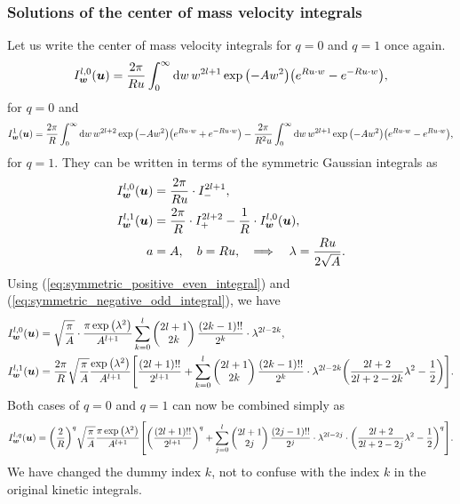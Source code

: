 \documentclass[aps,prl,preprint,groupedaddress,10pt]{revtex4-2}
\begin{document}
\subsubsection{Solutions of the center of mass velocity integrals}
Let us write the center of mass velocity integrals for $q=0$ and $q=1$ once again.
\begin{equation}
    I_{\bw}^{l,0}(\bu)=\frac{2\pi}{Ru}\int_0^{\infty}\dd{w}w^{2l+1}\exp\pqty{-Aw^2}
    \pqty{e^{Ru\cdot w}-e^{-Ru\cdot w}},
\end{equation}
for $q=0$ and
\begin{equation}
    I_{\bw}^{1}(\bu)=\frac{2\pi}{R}\int_0^{\infty}\dd{w}w^{2l+2}\exp\pqty{-Aw^2}
    \pqty{e^{Ru\cdot w}+e^{-Ru\cdot w}}
    -\frac{2\pi}{R^2u}\int_0^{\infty}\dd{w}w^{2l+1}\exp\pqty{-Aw^2}
    \pqty{e^{Ru\cdot w}-e^{Ru\cdot w}},
\end{equation}
for $q=1$. They can be written in terms of the symmetric Gaussian integrals as
\begin{equation}
    \begin{split}
        I_{\vb*{w}}^{l,0}(\vb*{u})&=\frac{2\pi}{Ru}\cdot I^{2l+1}_{-},\\
        I_{\vb*{w}}^{l,1}(\vb*{u})&=\frac{2\pi}{R}\cdot I^{2l+2}_{+}-\frac{1}{R}\cdot I_{\vb*{w}}^{l,0}(\vb*{u}),\\
        a&=A,\quad b=Ru,\quad\Longrightarrow\quad\lambda=\frac{Ru}{2\sqrt{A}}.
    \end{split}
\end{equation}
Using (\ref{eq:symmetric_positive_even_integral}) and (\ref{eq:symmetric_negative_odd_integral}), we have
\begin{equation}
    \begin{split}
        I_{\bw}^{l,0}(\bu)&=\sqrt{\frac{\pi}{A}}\cdot\frac{\pi\exp\pqty{\lambda^2}}{A^{l+1}}
        \sum_{k=0}^{l}\pmqty{2l+1\\2k}\frac{(2k-1)!!}{2^{k}}\cdot\lambda^{2l-2k},\\
        I_{\bw}^{l,1}(\bu)&=\frac{2\pi}{R}\sqrt{\frac{\pi}{A}}\frac{\exp\pqty{\lambda^2}}{A^{l+1}}
        \bqty{\frac{(2l+1)!!}{2^{l+1}}+\sum_{k=0}^{l}\pmqty{2l+1\\2k}\frac{(2k-1)!!}{2^k}
            \cdot\lambda^{2l-2k}\pqty{\frac{2l+2}{2l+2-2k}\lambda^2-\frac{1}{2}}}.
    \end{split}
\end{equation}
Both cases of $q=0$ and $q=1$ can now be combined simply as
\begin{equation}
    I_{\bw}^{l,q}(\bu)=\pqty{\frac{2}{R}}^q\sqrt{\frac{\pi}{A}}\frac{\pi\exp\pqty{\lambda^2}}{A^{l+1}}
    \bqty{\pqty{\frac{(2l+1)!!}{2^{l+1}}}^q+\sum_{j=0}^{l}\pmqty{2l+1\\2j}\frac{(2j-1)!!}{2^j}
        \cdot\lambda^{2l-2j}\cdot\pqty{\frac{2l+2}{2l+2-2j}\lambda^2-\frac{1}{2}}^q}.
\end{equation}
We have changed the dummy index $k$, not to confuse with the index $k$ in the original kinetic integrals.
\end{document}
